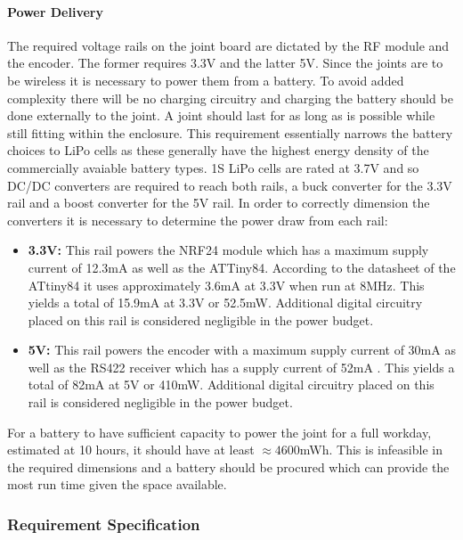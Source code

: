 \paragraph{Power Delivery} %
\label{par:power_delivery}
The required voltage rails on the joint board are dictated by the RF module and the encoder.
The former requires 3.3V and the latter 5V.
Since the joints are to be wireless it is necessary to power them from a battery.
To avoid added complexity there will be no charging circuitry and charging the battery should be done externally to the joint.
A joint should last for as long as is possible while still fitting within the enclosure.
This requirement essentially narrows the battery choices to LiPo cells as these generally have the highest energy density of the commercially avaiable battery types.
1S LiPo cells are rated at 3.7V and so DC/DC converters are required to reach both rails, a buck converter for the 3.3V rail and a boost converter for the 5V rail.
In order to correctly dimension the converters it is necessary to determine the power draw from each rail:
\begin{itemize}
 	\item \textbf{3.3V:} This rail powers the NRF24 module which has a maximum supply current of 12.3mA \cite{NFR24L01} as well as the ATTiny84.
 	According to the datasheet of the ATtiny84 it uses approximately 3.6mA at 3.3V when run at 8MHz.   
 	This yields a total of 15.9mA at 3.3V or 52.5mW.
 	Additional digital circuitry placed on this rail is considered negligible in the power budget.
 	\item \textbf{5V:} This rail powers the encoder with a maximum supply current of 30mA \cite{RLC2IC} as well as the RS422 receiver which has a supply current of 52mA \cite{rs422rec}.
 	This yields a total of 82mA at 5V or 410mW.
 	Additional digital circuitry placed on this rail is considered negligible in the power budget.
\end{itemize}
For a battery to have sufficient capacity to power the joint for a full workday, estimated at 10 hours, it should have at least $\approx4600$mWh.
This is infeasible in the required dimensions and a battery should be procured which can provide the most run time given the space available.

\subsubsection{Requirement Specification}

